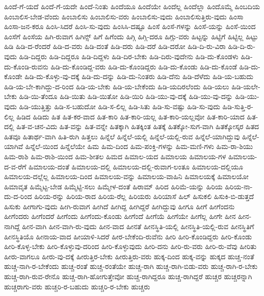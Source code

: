 {ಹಿಂದೆ-ಗೆ-ಯದೆ
ಹಿಂದೆ-ಗೆ-ಯದೇ
ಹಿಂದೆ-ನಿಂತು
ಹಿಂದೆಯೂ
ಹಿಂದೆಯೇ
ಹಿಂದೆಲ್ಲ
ಹಿಂದೆಲ್ಲಾ
ಹಿಂದೊಮ್ಮೆ
ಹಿಂಬದಿಯ
ಹಿಂಬಾಲಿಸ-ಬೇಡ-ವೆಂದು
ಹಿಂಬಾಲಿಸು
ಹಿಂಬಾಲಿಸು-ವರು
ಹಿಂಬಾಲಿಸು-ವುದು
ಹಿಂಬಾಲಿಸುತ್ತಿರು-ವುದು
ಹಿಂಸಾ
ಹಿಂಸಾ-ಜನ-ಕರೂ
ಹಿಂಸಿ-ಸಿದರೆ
ಹಿಂಸಿ-ಸು-ವುದು
ಹಿಂಸಿಸಿ-ದಷ್ಟೂ
ಹಿಂಸೆ
ಹಿಂಸೆ-ಗಳನ್ನು
ಹಿಂಸೆ-ಯನ್ನು
ಹಿಂಸೆ-ಯಿಂದ
ಹಿಂಸೆಗೆ
ಹಿಂಸೆಯ
ಹಿಗಿ-ರುವಾಗ
ಹಿಗಿನ್ಸ್
ಹಿಗೆ
ಹಿಗೆಂದು
ಹಿಗ್ಗಿ
ಹಿಗ್ಗಿ-ದರೂ
ಹಿಗ್ಗು-ವರು
ಹಿಟ್ಟನ್ನು
ಹಿಟ್ಟಿಗೆ
ಹಿಟ್ಟಿಲ್ಲ
ಹಿಟ್ಟು
ಹಿಡಿ
ಹಿಡಿ-ದ-ರೆಂದರೆ
ಹಿಡಿ-ದ-ವರು
ಹಿಡಿ-ದಂತೆ
ಹಿಡಿ-ದರು
ಹಿಡಿ-ದರೆ
ಹಿಡಿ-ದರೋ
ಹಿಡಿ-ದಿ-ರು-ವಿರಾ
ಹಿಡಿ-ದಿ-ರು-ವುದು
ಹಿಡಿ-ದಿದ್ದರು
ಹಿಡಿ-ದಿದ್ದರೂ
ಹಿಡಿ-ದಿದ್ದಳು
ಹಿಡಿ-ದಿರ-ಬೇಕು
ಹಿಡಿ-ದಿರು-ವುದೇನು
ಹಿಡಿ-ದು-ಕೊಂಡಳು
ಹಿಡಿ-ದು-ಕೊಂಡಿ-ರುವನು
ಹಿಡಿ-ದು-ಕೊಂಡಿದ್ದ-ವರು
ಹಿಡಿ-ದು-ಕೊಂಡಿದ್ದರು
ಹಿಡಿ-ದು-ಕೊಂಡು
ಹಿಡಿ-ದು-ಕೊಂಡೆ
ಹಿಡಿ-ದು-ಕೊಂಡೇ
ಹಿಡಿ-ದು-ಕೊಳ್ಳು-ವು-ದಕ್ಕೆ
ಹಿಡಿ-ದು-ದನ್ನು
ಹಿಡಿ-ದು-ನಿಂತರು
ಹಿಡಿ-ದೆನು
ಹಿಡಿ-ದೆಳೆದು
ಹಿಡಿ-ಯ-ಬಹುದು
ಹಿಡಿ-ಯ-ಬೇ-ಕಾಗಿದ್ದು-ದ-ರಿಂದ
ಹಿಡಿ-ಯ-ಬೇಕು
ಹಿಡಿ-ಯ-ಬೇಕೆಂದು
ಹಿಡಿ-ಯದಿರಲೆಂದು
ಹಿಡಿ-ಯಲು
ಹಿಡಿ-ಯಲೇ-ಬೇಕು
ಹಿಡಿ-ಯಿ-ತೆಂದೂ
ಹಿಡಿ-ಯಿತು
ಹಿಡಿ-ಯಿತೋ
ಹಿಡಿ-ಯಿರಿ
ಹಿಡಿ-ಯು-ವು-ದಕ್ಕೆ
ಹಿಡಿ-ಯು-ವು-ದನ್ನು
ಹಿಡಿ-ಯು-ವುದು
ಹಿಡಿ-ಯುತ್ತಿತ್ತು
ಹಿಡಿ-ಸ-ಬಹುದೋ
ಹಿಡಿ-ಸ-ಲಿಲ್ಲ
ಹಿಡಿ-ಸಿತು
ಹಿಡಿ-ಸು-ವಷ್ಟು
ಹಿಡಿ-ಸು-ವುದು
ಹಿಡಿ-ಸುತ್ತಿ-ರ-ಲಿಲ್ಲ
ಹಿಡಿದ
ಹಿಡಿದು
ಹಿತ
ಹಿತ-ಕರ-ವಾದ
ಹಿತ-ಕಾರಿ
ಹಿತ-ಕಾರಿ-ಯಲ್ಲ
ಹಿತ-ಕಾರಿ-ಯಲ್ಲವೋ
ಹಿತ-ಕಾರಿ-ಯಾದ
ಹಿತ-ದಲ್ಲಿ
ಹಿತ-ವ-ಚನ-ವಿದು
ಹಿತ-ವನ್ನು
ಹಿತ-ವನ್ನೇ
ಹಿತಕ್ಕಾಗಿ
ಹಿತಕ್ಕಿಂತ
ಹಿತಕ್ಕೆ
ಹಿತಕ್ಕೋ-ಸುಗ-ವಾಗಿ
ಹಿತಕ್ಕೋಸ್ಕರ
ಹಿತದ
ಹಿತವೂ
ಹಿತಾರ್ಥ-ವಾಗಿ
ಹಿತಿ-ರುಗಿ
ಹಿತ್ತಲು
ಹಿನ್ನೆಲೆ
ಹಿನ್ನೆಲೆ-ಯಲ್ಲಿ
ಹಿನ್ನೆಲೆ-ಯಲ್ಲಿ-ರುವ
ಹಿನ್ನೆಲೆ-ಯಾಗಿದ್ದುವು
ಹಿನ್ನೆಲೆ-ಯಾಗಿವೆ
ಹಿನ್ನೆಲೆ-ಯಿಂದ
ಹಿನ್ನೆಲೆಯೇ
ಹಿಮ
ಹಿಮ-ದಿಂದ
ಹಿಮ-ಪಂಕ್ತಿ-ಗಳನ್ನು
ಹಿಮ-ಮಣಿ-ಗಳು
ಹಿಮ-ರಾ-ಶಿಯು
ಹಿಮ-ರಾಶಿ
ಹಿಮ-ರಾಶಿ-ಯಿಂದ
ಹಿಮ-ಶೀತಲ
ಹಿಮದ
ಹಿಮಾಲ-ಯದ
ಹಿಮಾಲಯ
ಹಿಮಾಲಯ-ಗಳ
ಹಿಮಾಲಯ-ದ-ವ-ರೆಗೆ
ಹಿಮಾಲಯ-ದಂತೆ
ಹಿಮಾಲಯ-ದಲ್ಲಿ
ಹಿಮಾಲಯ-ದಲ್ಲಿ-ರುವಾಗ-ಲಂತೂ
ಹಿಮಾಲಯ-ದಲ್ಲಿಯೂ
ಹಿಮಾಲಯ-ದಲ್ಲೆಲ್ಲ
ಹಿಮಾಲಯ-ದಿಂದ
ಹಿಮಾಲಯ-ವನ್ನು
ಹಿಮಾಲಯ-ವಾಹಿನಿ
ಹಿಮಾಲಯಕ್ಕೆ
ಹಿಮಾಲಯೋ
ಹಿಮಾವೃತ
ಹಿಮ್ಮೆಟ್ಟ-ಬೇಡ
ಹಿಮ್ಮೆಟ್ಟಿ-ಸಲು
ಹಿಮ್ಮೇಳ-ದಂತೆ
ಹಿರಾಮ್
ಹಿರಿದ
ಹಿರಿಮೆ-ಯನ್ನು
ಹಿರಿಯ
ಹಿರಿಯ-ನಾ-ದು-ದ-ರಿಂದ
ಹಿರಿಯ-ರನ್ನು
ಹಿರಿಯ-ರಾದ
ಹಿರಿಯ-ರೆಲ್ಲ
ಹಿರಿಯರು
ಹಿರಿಯಾಸೆ
ಹಿಲ್
ಹಿಸುಕಲಿ
ಹಿಸುಕಿ-ಬಿ-ಡುತ್ತದೆ
ಹಿಸುಕು
ಹೀಗಾಗು-ವುದು
ಹೀಗಿ-ರುವಾಗ
ಹೀಗಿದೆ
ಹೀಗಿದ್ದ
ಹೀಗಿದ್ದರೆ
ಹೀಗಿದ್ದುವು
ಹೀಗೂ
ಹೀಗೆ
ಹೀಗೆಂದನು
ಹೀಗೆಂದರು
ಹೀಗೆಂದರೆ
ಹೀಗೆಂದು
ಹೀಗೆಂದು-ಕೊಂಡು
ಹೀಗೆಂದೆ
ಹೀಗೆಯೆ
ಹೀಗೆಯೇ
ಹೀಗೆಲ್ಲ
ಹೀಗೇ
ಹೀನ
ಹೀನ-ನಾಗಿದ್ದೆ
ಹೀನ-ವಾಗಿ
ಹೀನ-ವಾಗಿ-ರು-ವುದು
ಹೀನ-ವಾದ
ಹೀನತೆ
ಹೀನಸ್ಥಿತಿ-ಯಲ್ಲಿ
ಹೀನಸ್ಥಿತಿ-ಯಲ್ಲಿ-ರುವ
ಹೀನಸ್ಥಿತಿಗೆ
ಹೀನಸ್ಥಿತಿಯೊ
ಹೀನಾಯ-ವಾದ
ಹೀಯಾಳಿ-ಸಿದರೆ
ಹೀರ-ಬೇಕೆಂದಿ-ರುವೆನು
ಹೀರಿ
ಹೀರಿ-ಕೊಂಡಿದ್ದರು
ಹೀರಿ-ಕೊಂಡು
ಹೀರಿ-ಕೊಳ್ಳ-ಬೇಕು
ಹೀರಿ-ಕೊಳ್ಳುವು-ದರಿಂದ
ಹೀರಿ-ಕೊಳ್ಳುವುದು
ಹೀರಿ-ದನು
ಹೀರಿ-ರು-ವರು
ಹೀರಿ-ರು-ವೆವು
ಹೀರಿತು
ಹೀರು-ವಾಗಲೂ
ಹೀರು-ವು-ದಕ್ಕೆ
ಹೀರುತ್ತಿರ-ಬೇಕು
ಹೀರುತ್ತಿರು-ವರು
ಹುಕ್ಕ-ದಿಂದ
ಹುಕ್ಕ-ವನ್ನು
ಹುಕ್ಕದ
ಹುಚ್ಚ-ನಂತೆ
ಹುಚ್ಚ-ನಾಗಿ-ರ-ಬೇಕೆಂದು
ಹುಚ್ಚ-ರಂತೆ
ಹುಚ್ಚ-ರಂತೆಯೇ
ಹುಚ್ಚ-ರಾಗಿ
ಹುಚ್ಚ-ರಾಗಿ-ಬಿಡು-ವರು
ಹುಚ್ಚ-ರಾಗಿ-ರ-ಬೇಕು
ಹುಚ್ಚ-ರಾಗಿ-ರುವ-ರೇನೊ
ಹುಚ್ಚ-ರಾಗಿ-ಹೋಗುತ್ತೇವೋ
ಹುಚ್ಚ-ರಾಗಿದ್ದರೂ
ಹುಚ್ಚ-ರಾಗಿದ್ದರೆ
ಹುಚ್ಚರ
ಹುಚ್ಚರನ್ನಾಗಿ
ಹುಚ್ಚರಾಗು-ವರು
ಹುಚ್ಚರಿ-ರ-ಬಹುದು
ಹುಚ್ಚರಿ-ರ-ಬೇಕು
ಹುಚ್ಚರು
}
